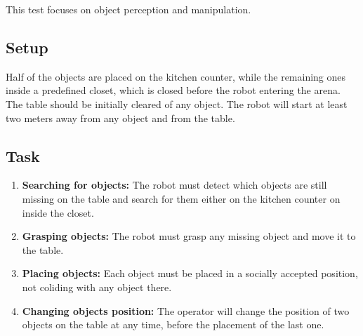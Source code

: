 This test focuses on object perception and manipulation.

\subsection{Setup}

Half of the objects are placed on the kitchen counter, while the remaining ones inside a predefined closet, which is closed before the robot entering the arena. The table should be initially cleared of any object. The robot will start at least two meters away from any object and from the table.

\subsection{Task}

\begin{enumerate}
\item \textbf{Searching for objects:} The robot must detect which objects are still missing on the table and search for them either on the kitchen counter on inside the closet.
\item \textbf{Grasping objects:} The robot must grasp any missing object and move it to the table.
\item \textbf{Placing objects:} Each object must be placed in a socially accepted position, not coliding with any object there.
\item \textbf{Changing objects position:} The operator will change the position of two objects on the table at any time, before the placement of the last one.
\end{enumerate}

